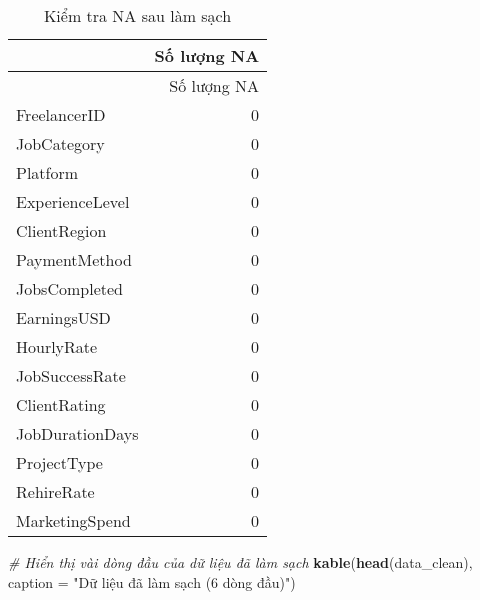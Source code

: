 \documentclass[
]{article}
\newenvironment{Shaded}{\begin{snugshade}}{\end{snugshade}}
\newcommand{\AttributeTok}[1]{\textcolor[rgb]{0.13,0.29,0.53}{#1}}
\newcommand{\CommentTok}[1]{\textcolor[rgb]{0.56,0.35,0.01}{\textit{#1}}}
\newcommand{\FunctionTok}[1]{\textcolor[rgb]{0.13,0.29,0.53}{\textbf{#1}}}
\newcommand{\NormalTok}[1]{#1}
\newcommand{\StringTok}[1]{\textcolor[rgb]{0.31,0.60,0.02}{#1}}
\begin{document}
\begin{longtable}[]{@{}lr@{}}
\caption{Kiểm tra NA sau làm sạch}\tabularnewline
\toprule\noalign{}
& Số lượng NA \\
\midrule\noalign{}
\endfirsthead
\toprule\noalign{}
& Số lượng NA \\
\midrule\noalign{}
\endhead
\bottomrule\noalign{}
\endlastfoot
FreelancerID & 0 \\
JobCategory & 0 \\
Platform & 0 \\
ExperienceLevel & 0 \\
ClientRegion & 0 \\
PaymentMethod & 0 \\
JobsCompleted & 0 \\
EarningsUSD & 0 \\
HourlyRate & 0 \\
JobSuccessRate & 0 \\
ClientRating & 0 \\
JobDurationDays & 0 \\
ProjectType & 0 \\
RehireRate & 0 \\
MarketingSpend & 0 \\
\end{longtable}

\begin{Shaded}
\begin{Highlighting}[]
\CommentTok{\# Hiển thị vài dòng đầu của dữ liệu đã làm sạch}
\FunctionTok{kable}\NormalTok{(}\FunctionTok{head}\NormalTok{(data\_clean), }\AttributeTok{caption =} \StringTok{"Dữ liệu đã làm sạch (6 dòng đầu)"}\NormalTok{)}
\end{Highlighting}
\end{Shaded}
\end{document}
